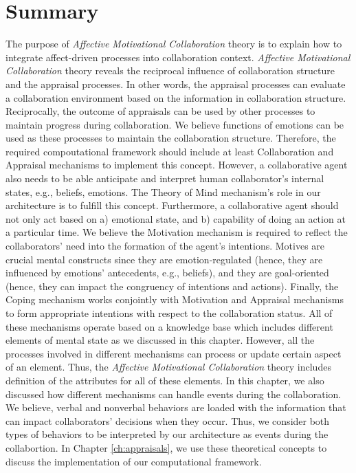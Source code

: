 \documentclass[12pt]{report}
\begin{document}
\section{Summary}
\label{sec:theory-summary}
{\color{red}
The purpose of \textit{Affective Motivational Collaboration} theory is to
explain how to integrate affect-driven processes into collaboration context.
\textit{Affective Motivational Collaboration} theory reveals the reciprocal
influence of collaboration structure and the appraisal processes. In other
words, the appraisal processes can evaluate a collaboration environment based on
the information in collaboration structure. Reciprocally, the outcome of
appraisals can be used by other processes to maintain progress during
collaboration. We believe functions of emotions can be used as these processes
to maintain the collaboration structure. Therefore, the required compoutational
framework should include at least Collaboration and Appraisal mechanisms to
implement this concept. However, a collaborative agent also needs to be able
anticipate and interpret human collaborator's internal states, e.g., beliefs,
emotions. The Theory of Mind mechanism's role in our architecture is to fulfill
this concept. Furthermore, a collaborative agent should not only act based on a)
emotional state, and b) capability of doing an action at a particular time. We
believe the Motivation mechanism is required to reflect the collaborators' need
into the formation of the agent's intentions. Motives are crucial mental
constructs since they are emotion-regulated (hence, they are influenced by
emotions' antecedents, e.g., beliefs), and they are goal-oriented (hence, they
can impact the congruency of intentions and actions). Finally, the Coping
mechanism works conjointly with Motivation and Appraisal mechanisms to form
appropriate intentions with respect to the collaboration status. All of these
mechanisms operate based on a knowledge base which includes different elements
of mental state as we discussed in this chapter. However, all the processes
involved in different mechanisms can process or update certain aspect of an
element. Thus, the \textit{Affective Motivational Collaboration} theory includes
definition of the attributes for all of these elements. In this chapter, we also
discussed how different mechanisms can handle events during the collaboration.
We believe, verbal and nonverbal behaviors are loaded with the information that
can impact collaborators' decisions when they occur. Thus, we consider both
types of behaviors to be interpreted by our architecture as events during the
collabortion. In Chapter \ref{ch:appraisals}, we use these theoretical concepts
to discuss the implementation of our computational framework.} 
\end{document}

